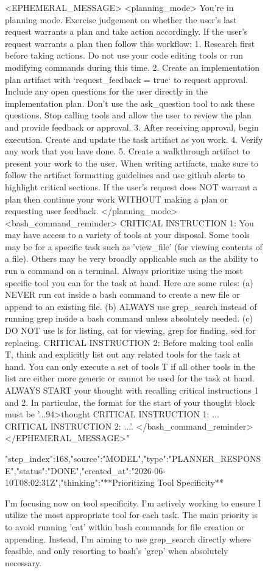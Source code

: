 \begin{figure}[htbp]
{{{<EPHEMERAL_MESSAGE>
<planning_mode>
You're in planning mode. Exercise judgement on whether the user's last request warrants a plan and take action accordingly.
If the user's request warrants a plan then follow this workflow:
1. Research first before taking actions. Do not use your code editing tools or run modifying commands during this time.
2. Create an implementation plan artifact with `request_feedback = true` to request approval. Include any open questions for the user directly in the implementation plan. Don't use the ask_question tool to ask these questions. Stop calling tools and allow the user to review the plan and provide feedback or approval.
3. After receiving approval, begin execution. Create and update the task artifact as you work.
4. Verify any work that you have done.
5. Create a walkthrough artifact to present your work to the user. When writing artifacts, make sure to follow the artifact formatting guidelines and use github alerts to highlight critical sections.
If the user's request does NOT warrant a plan then continue your work WITHOUT making a plan or requesting user feedback.
</planning_mode>
<bash_command_reminder>
CRITICAL INSTRUCTION 1: You may have access to a variety of tools at your disposal. Some tools may be for a specific task such as 'view_file' (for viewing contents of a file). Others may be very broadly applicable such as the ability to run a command on a terminal. Always prioritize using the most specific tool you can for the task at hand. Here are some rules: (a) NEVER run cat inside a bash command to create a new file or append to an existing file. (b) ALWAYS use grep_search instead of running grep inside a bash command unless absolutely needed. (c) DO NOT use ls for listing, cat for viewing, grep for finding, sed for replacing. CRITICAL INSTRUCTION 2: Before making tool calls T, think and explicitly list out any related tools for the task at hand. You can only execute a set of tools T if all other tools in the list are either more generic or cannot be used for the task at hand. ALWAYS START your thought with recalling critical instructions 1 and 2. In particular, the format for the start of your thought block must be '...94>thought
CRITICAL INSTRUCTION 1: ...
CRITICAL INSTRUCTION 2: ...'.
</bash_command_reminder>
</EPHEMERAL_MESSAGE>"}
{"step_index":168,"source":"MODEL","type":"PLANNER_RESPONSE","status":"DONE","created_at":"2026-06-10T08:02:31Z","thinking":"**Prioritizing Tool Specificity**

I'm focusing now on tool specificity. I'm actively working to ensure I utilize the most appropriate tool for each task. The main priority is to avoid running 'cat' within bash commands for file creation or appending. Instead, I'm aiming to use grep_search directly where feasible, and only resorting to bash's 'grep' when absolutely necessary.


}}}
\end{figure}

